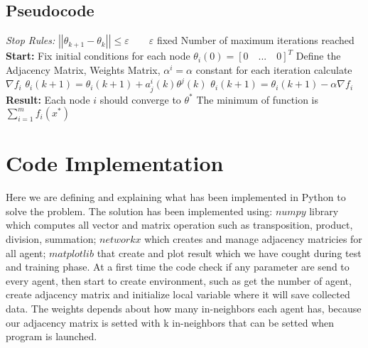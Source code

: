 \documentclass[a4paper,11pt,oneside]{book}
\begin{document}
\subsection {Pseudocode} \label{Subsec1.1.3}
\begin{algorithm}
\caption{}
\begin{algorithmic} [1]
\State \textit{Stop Rules:}
\State $\left|\left|\theta_{k+1} - \theta_k\right|\right|  \leq \varepsilon \qquad \varepsilon$ fixed
\State Number of maximum iterations reached
\State \textbf{Start:}
\State Fix initial conditions for each node $\theta_i(0) = [0 \quad ... \quad 0]^T$
\State Define the Adjacency Matrix, Weights Matrix, $\alpha^i = \alpha$ constant for each iteration
    \State calculate $\nabla f_i$
        \State $\theta_i(k+1) = \theta_i(k+1) + a^i_j(k) \theta^j(k)$
    \EndFor
    \State $\theta_i(k+1) = \theta_i(k+1) - \alpha \nabla f_i$
\EndWhile
\State \textbf{Result:}
\State Each node $i$ should converge to $\theta^*$
\State The minimum of function is $\sum \limits_{i=1}^{m}f_i(x^*)$
\end{algorithmic}
\end{algorithm}


\section {Code Implementation} \label{Sec1.2}

Here we are defining and explaining what has been implemented in Python to solve the problem. The solution has been
implemented using: $numpy$ library which computes all vector and matrix operation such as transposition, product, division,
summation; $networkx$ which creates and manage adjacency matricies for all agent; $matplotlib$ that create and plot result
which we have cought during test and training phase. At a first time the code check if any parameter are send to every agent,
then start to create environment, such as get the number of agent, create adjacency matrix and initialize local variable where
it will save collected data. The weights depends about how many in-neighbors each agent has, because our adjacency matrix is
setted with k in-neighbors that can be setted when program is launched. \\
\end{document}
